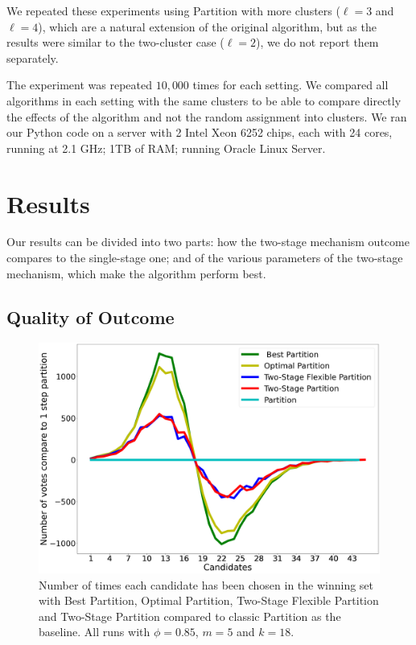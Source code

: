 \documentclass[letterpaper]{article}
\begin{document}
We repeated these experiments using Partition with more clusters ($\ell=3$ and $\ell=4$), which are a natural extension of the original \citet{AFPT11} algorithm, but as the results were similar to the two-cluster case ($\ell=2$), we do not report them separately.

The experiment was repeated $10,000$ times for each setting. We compared all algorithms in each setting with the same clusters to be able to compare directly the effects of the algorithm and not the random assignment into clusters. We ran our Python code on a server with 2 Intel Xeon 6252 chips, each with 24 cores, running at 2.1 GHz; 1TB of RAM; running Oracle Linux Server.


\section{Results}\label{results}
Our results can be divided into two parts: how the two-stage mechanism outcome compares to the single-stage one; and of the various parameters of the two-stage mechanism, which make the algorithm perform best.




\subsection{Quality of Outcome}

\begin{figure}
 \centering
 \includegraphics[width=\columnwidth]{./images/candidates_results_18_winners_phi_0_85_last_new_new_new_new.png}
 \caption{Number of times each candidate has been chosen in the winning set with Best Partition, Optimal Partition, Two-Stage Flexible Partition and Two-Stage Partition compared to classic Partition as the baseline. All runs with $\phi = 0.85$, $m = 5$ and $k = 18$.}
 \label{fig:candidates-performances}
\end{figure}
\end{document}
